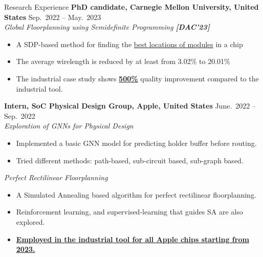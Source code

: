 \begin{rSection}{Research Experience}
    {\bf PhD candidate, Carnegie Mellon University, United States}               \hfill { Sep.~2022 -- May.~2023} \\
    \textit{Global Floorplanning using Semidefinite Programming \textbf{[{{DAC'23}}]}} 
    \begin{itemize}[noitemsep,topsep=-5pt]
        \item A SDP-based method for finding the \underline{best locations of modules} in a chip
        \item The average wirelength is reduced by at least from 3.02\% to 20.01\%
        \item The industrial case study shows \underline{\textbf{500\%}} quality improvement compared to the industrial tool.\\
    \end{itemize} 

{\bf Intern, SoC Physical Design Group, Apple, United States}               \hfill { June.~2022 -- Sep.~2022} \\
\textit{Exploration of GNNs for Physical Design }
\begin{itemize}[noitemsep,topsep=-5pt]
    \item Implemented a basic GNN model for predicting holder buffer before routing.
    \item Tried different methods: path-based, sub-circuit based, sub-graph based.
\end{itemize}
\textit{Perfect Rectilinear Floorplanning}
\begin{itemize}[noitemsep,topsep=-5pt]
    \item A Simulated Annealing based algorithm for perfect rectilinear floorplanning.
    \item Reinforcement learning, and supervised-learning that guides SA are also explored.
    \item \underline{\textbf{{Employed in the industrial tool for all Apple chips starting from 2023.}}}\\
\end{itemize}


\end{rSection}
